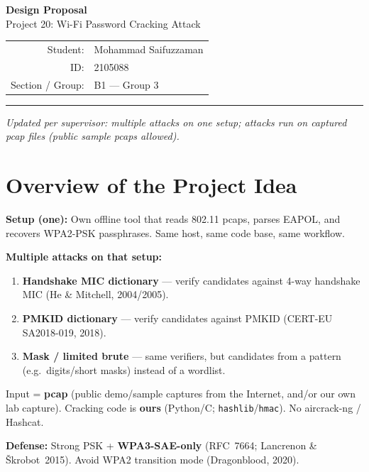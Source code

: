 \documentclass[11pt,a4paper]{article}
\begin{document}
\begin{center}
{\LARGE\bfseries Design Proposal}\\[0.35em]
{\large Project 20: Wi-Fi Password Cracking Attack}\\[0.5em]
\begin{tabular}{rl}
Student: & Mohammad Saifuzzaman \\
ID: & 2105088 \\
Section / Group: & B1 --- Group 3 \\
\end{tabular}
\end{center}

\vspace{0.4em}
\noindent\rule{\textwidth}{0.4pt}
\vspace{0.3em}

\noindent\textit{Updated per supervisor: multiple attacks on one setup; attacks run on
captured pcap files (public sample pcaps allowed).}

\section{Overview of the Project Idea}

\textbf{Setup (one):} Own offline tool that reads 802.11 pcaps, parses EAPOL,
and recovers WPA2-PSK passphrases. Same host, same code base, same workflow.

\textbf{Multiple attacks on that setup:}
\begin{enumerate}
  \item \textbf{Handshake MIC dictionary} --- verify candidates against 4-way
        handshake MIC (He \& Mitchell, 2004/2005).
  \item \textbf{PMKID dictionary} --- verify candidates against PMKID
        (CERT-EU SA2018-019, 2018).
  \item \textbf{Mask / limited brute} --- same verifiers, but candidates from a
        pattern (e.g.\ digits/short masks) instead of a wordlist.
\end{enumerate}

Input = \textbf{pcap} (public demo/sample captures from the Internet, and/or our
own lab capture). Cracking code is \textbf{ours} (Python/C; \texttt{hashlib}/\texttt{hmac}).
No aircrack-ng / Hashcat.

\textbf{Defense:} Strong PSK + \textbf{WPA3-SAE-only} (RFC~7664; Lancrenon \&
\v{S}krobot~2015). Avoid WPA2 transition mode (Dragonblood, 2020).
\end{document}
